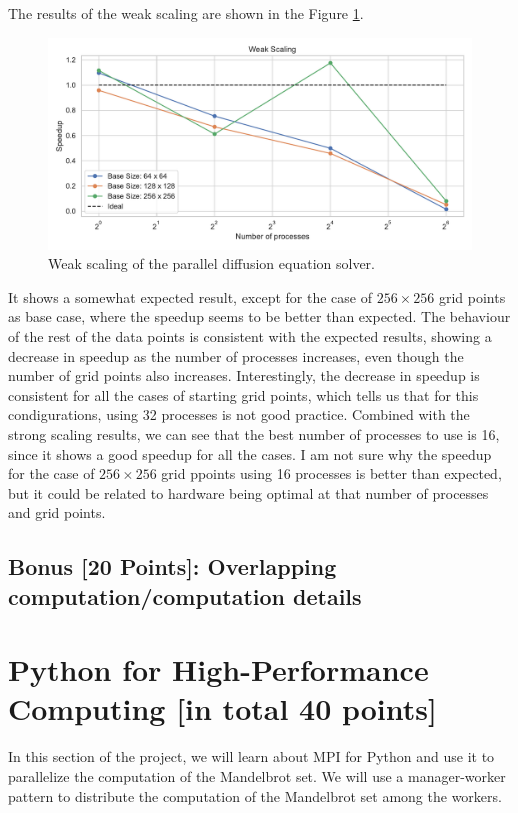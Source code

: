 \documentclass[unicode,11pt,a4paper,oneside,numbers=endperiod,openany]{scrartcl}
\begin{document}
The results of the weak scaling are shown in the Figure \ref{fig:weak}.
\begin{figure}[h!]
    \centering
    \includegraphics[width=\textwidth]{../mini_app_mpi/weak_scaling_plot.pdf}
    \caption{Weak scaling of the parallel diffusion equation solver.}
    \label{fig:weak}
\end{figure}
It shows a somewhat expected result, except for the case of $256 \times 256$
grid points as base case, where the speedup seems to be better than expected.
The behaviour of the rest of the data points is consistent with the expected
results, showing a decrease in speedup as the number of processes increases,
even though the number of grid points also increases. Interestingly, the
decrease in speedup is consistent for all the cases of starting grid points,
which tells us that for this condigurations, using 32 processes is not good
practice. Combined with the strong scaling results, we can see that the best
number of processes to use is 16, since it shows a good speedup for all the
cases. I am not sure why the speedup for the case of $256 \times 256$ grid
ppoints using 16 processes is better than expected, but it could be related to hardware being
optimal at that number of processes and grid points.

\subsection{Bonus [20 Points]: Overlapping computation/computation details}


\section{Python for High-Performance Computing [in total 40 points]}
In this section of the project, we will learn about MPI for Python and use it
to parallelize the computation of the Mandelbrot set. We will use a
manager-worker
pattern to distribute the computation of the Mandelbrot set among the workers.
\end{document}
